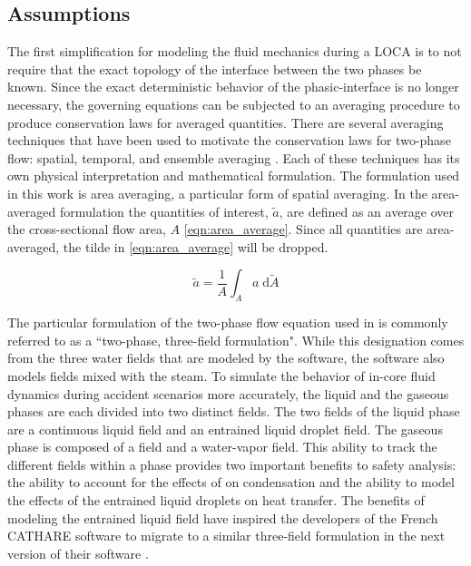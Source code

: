 \subsection{Assumptions}
\label{subsect:assumptions}

The first simplification for modeling the fluid mechanics during a LOCA is to not require that the exact topology of the interface between the two phases be known.
Since the exact deterministic behavior of the phasic-interface is no longer necessary, the governing equations can be subjected to an averaging procedure to produce conservation laws for averaged quantities.
There are several averaging techniques that have been used to motivate the conservation laws for two-phase flow: spatial, temporal, and ensemble averaging \cite{Drew1998, Todreas2011}.
Each of these techniques has its own physical interpretation and mathematical formulation.
The formulation used in this work is area averaging, a particular form of spatial averaging.
In the area-averaged formulation the quantities of interest, $\tilde{a}$, are defined as an average over the cross-sectional flow area, $A$ \eqref{eqn:area_average}.
Since all quantities are area-averaged, the tilde in \eqref{eqn:area_average} will be dropped.

\begin{equation}
\label{eqn:area_average}
\tilde{a} = \frac{1}{A}\int_{A} a \;\mathrm{d}\tilde{A}
\end{equation}

The particular formulation of the two-phase flow equation used in \cobra{} is commonly referred to as a ``two-phase, three-field formulation".
While this designation comes from the three water fields that are modeled by the software, the software also models \ncg{} fields mixed with the steam.
To simulate the behavior of in-core fluid dynamics during accident scenarios more accurately, the liquid and the gaseous phases are each divided into two distinct fields.
The two fields of the liquid phase are a continuous liquid field and an entrained liquid droplet field.
The gaseous phase is composed of a \ncg{} field and a water-vapor field. 
This ability to track the different fields within a phase provides two important benefits to safety analysis: the ability to account for the effects of \ncgs{} on condensation and the ability to model the effects of the entrained liquid droplets on heat transfer.
The benefits of modeling the entrained liquid field have inspired the developers of the French CATHARE software to migrate to a similar three-field formulation in the next version of their software \cite{Emonot2011}.

